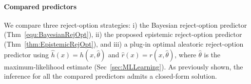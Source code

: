 
\paragraph{Compared predictors} We compare three reject-option strategies:
i) the Bayesian reject-option predictor (Thm~\ref{equ:BayesianRejOpt}), ii)
the proposed epistemic reject-option predictor (Thm~\ref{thm:EpistemicRejOpt}), and iii) a plug-in optimal aleatoric reject-option predictor using $\hat{h}(x) = h(x, \hat{\theta})$ and $\hat{r}(x) = r(x, \hat{\theta})$, where $\hat{\theta}$ is the maximum-likelihood estimate (Sec~\ref{sec:MLLearning}).
As previously shown, the inference for all the compared predictors admits a closed-form solution.

\vspace{-0.23cm}


